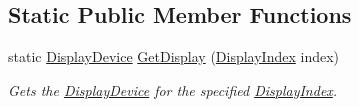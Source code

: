 \subsection*{Static Public Member Functions}
\begin{DoxyCompactItemize}
\item 
static \hyperlink{class_open_t_k_1_1_display_device}{Display\-Device} \hyperlink{class_open_t_k_1_1_display_device_afed73feb8e68d477cf314b33c351e661}{Get\-Display} (\hyperlink{namespace_open_t_k_a2869ea59bcff91cc6cc331f36c616389}{Display\-Index} index)
\begin{DoxyCompactList}\small\item\em Gets the \hyperlink{class_open_t_k_1_1_display_device}{Display\-Device} for the specified \hyperlink{namespace_open_t_k_a2869ea59bcff91cc6cc331f36c616389}{Display\-Index}. \end{DoxyCompactList}\end{DoxyCompactItemize}
